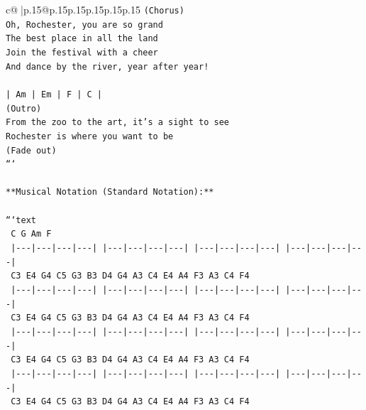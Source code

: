 \documentclass{article}
\begin{document}
{\begin{supertabular}{c@{$\;$}|p{.15\linewidth}@{}p{.15\linewidth}p{.15\linewidth}p{.15\linewidth}p{.15\linewidth}p{.15\linewidth}}
{{{\texttt{(Chorus)} \\
\texttt{Oh, Rochester, you are so grand} \\
\texttt{The best place in all the land} \\
\texttt{Join the festival with a cheer} \\
\texttt{And dance by the river, year after year!} \\
\\ 
\texttt{| Am  | Em  | F   | C   |} \\
\texttt{(Outro)} \\
\texttt{From the zoo to the art, it's a sight to see} \\
\texttt{Rochester is where you want to be} \\
\texttt{(Fade out)} \\
\texttt{```} \\
\\ 
\texttt{**Musical Notation (Standard Notation):**} \\
\\ 
\texttt{```text} \\
\texttt{      C           G           Am          F} \\
\texttt{      |{-}{-}{-}|{-}{-}{-}|{-}{-}{-}|{-}{-}{-}|   |{-}{-}{-}|{-}{-}{-}|{-}{-}{-}|{-}{-}{-}|   |{-}{-}{-}|{-}{-}{-}|{-}{-}{-}|{-}{-}{-}|   |{-}{-}{-}|{-}{-}{-}|{-}{-}{-}|{-}{-}{-}|} \\
\texttt{      C3  E4  G4  C5     G3  B3  D4  G4     A3  C4  E4  A4     F3  A3  C4  F4} \\
\texttt{      |{-}{-}{-}|{-}{-}{-}|{-}{-}{-}|{-}{-}{-}|   |{-}{-}{-}|{-}{-}{-}|{-}{-}{-}|{-}{-}{-}|   |{-}{-}{-}|{-}{-}{-}|{-}{-}{-}|{-}{-}{-}|   |{-}{-}{-}|{-}{-}{-}|{-}{-}{-}|{-}{-}{-}|} \\
\texttt{      C3  E4  G4  C5     G3  B3  D4  G4     A3  C4  E4  A4     F3  A3  C4  F4} \\
\texttt{      |{-}{-}{-}|{-}{-}{-}|{-}{-}{-}|{-}{-}{-}|   |{-}{-}{-}|{-}{-}{-}|{-}{-}{-}|{-}{-}{-}|   |{-}{-}{-}|{-}{-}{-}|{-}{-}{-}|{-}{-}{-}|   |{-}{-}{-}|{-}{-}{-}|{-}{-}{-}|{-}{-}{-}|} \\
\texttt{      C3  E4  G4  C5     G3  B3  D4  G4     A3  C4  E4  A4     F3  A3  C4  F4} \\
\texttt{      |{-}{-}{-}|{-}{-}{-}|{-}{-}{-}|{-}{-}{-}|   |{-}{-}{-}|{-}{-}{-}|{-}{-}{-}|{-}{-}{-}|   |{-}{-}{-}|{-}{-}{-}|{-}{-}{-}|{-}{-}{-}|   |{-}{-}{-}|{-}{-}{-}|{-}{-}{-}|{-}{-}{-}|} \\
\texttt{      C3  E4  G4  C5     G3  B3  D4  G4     A3  C4  E4  A4     F3  A3  C4  F4} \\
}}}
\end{supertabular}}
\end{document}
